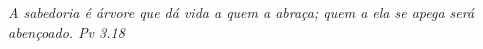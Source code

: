\begin{dedicatoria}
   \vspace*{\fill}
   \centering
   \noindent

   \textit{A sabedoria é árvore que dá vida a quem a abraça; quem a ela se apega será abençoado. Pv 3.18} \vspace*{\fill}
\end{dedicatoria}
